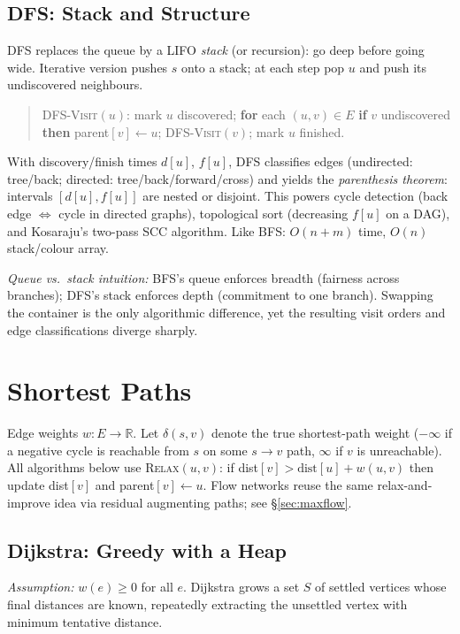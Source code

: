\subsection{DFS: Stack and Structure}
\textsc{DFS} replaces the queue by a LIFO \emph{stack} (or recursion): go deep before going wide. Iterative version pushes $s$ onto a stack; at each step pop $u$ and push its undiscovered neighbours.

\begin{quote}\ttfamily\scriptsize
\textsc{DFS-Visit}$(u)$: mark $u$ discovered; \textbf{for} each $(u,v)\in E$ \textbf{if} $v$ undiscovered \textbf{then} parent$[v]\gets u$; \textsc{DFS-Visit}$(v)$; mark $u$ finished.
\end{quote}

{\sloppy
With discovery/finish times $d[u]$, $f[u]$, DFS classifies edges (undirected: tree/back; directed: tree/back/forward/cross) and yields the \emph{parenthesis theorem}: intervals $[d[u],f[u]]$ are nested or disjoint. This powers cycle detection (back edge $\Leftrightarrow$ cycle in directed graphs), topological sort (decreasing $f[u]$ on a DAG), and Kosaraju's two-pass SCC algorithm. Like BFS: $O(n+m)$ time, $O(n)$ stack/colour array.\par}

\textit{Queue vs.\ stack intuition:} BFS's queue enforces breadth (fairness across branches); DFS's stack enforces depth (commitment to one branch). Swapping the container is the only algorithmic difference, yet the resulting visit orders and edge classifications diverge sharply.

\section{Shortest Paths}
\label{sec:shortest}
Edge weights $w:E\to\mathbb{R}$. Let $\delta(s,v)$ denote the true shortest-path weight ($-\infty$ if a negative cycle is reachable from $s$ on some $s\to v$ path, $\infty$ if $v$ is unreachable). All algorithms below use \textsc{Relax}$(u,v)$: if dist$[v]>\text{dist}[u]+w(u,v)$ then update dist$[v]$ and parent$[v]\gets u$. Flow networks reuse the same relax-and-improve idea via residual augmenting paths; see \S\ref{sec:maxflow}.

\subsection{Dijkstra: Greedy with a Heap}
\textit{Assumption:} $w(e)\ge 0$ for all $e$. Dijkstra grows a set $S$ of settled vertices whose final distances are known, repeatedly extracting the unsettled vertex with minimum tentative distance.

